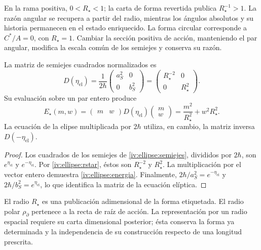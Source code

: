 En la rama positiva, \(0<R_\star<1\); la carta de forma
revertida publica \(R_\star^{-1}>1\). La razón angular
se recupera a partir del radio, mientras los ángulos absolutos
y su historia permanecen en el estado enriquecido.
La forma circular corresponde a \(C^*/A=0\), con
\(R_\star=1\). Cambiar la sección positiva de acción,
manteniendo el par angular, modifica la escala común de
los semiejes y conserva su razón.

\begin{proposition}
\label{iv:ellipse:matriz-prop}
La matriz de semiejes cuadrados normalizados es
\begin{equation}
 D(\eta_{\mathrm{el}})
 =\frac1{2\hbar}
    \begin{pmatrix}a_S^2&0\\0&b_S^2\end{pmatrix}
 =\begin{pmatrix}R_\star^{-2}&0\\0&R_\star^2\end{pmatrix}.
 \label{iv:ellipse:matriz}
\end{equation}
Su evaluación sobre un par entero produce
\begin{equation}
 E_\star(m,w)=
 \begin{pmatrix}m&w\end{pmatrix}
 D(\eta_{\mathrm{el}})
 \begin{pmatrix}m\\w\end{pmatrix}
 =\frac{m^2}{R_\star^2}+w^2R_\star^2.
 \label{iv:ellipse:energia}
\end{equation}
La ecuación de la elipse multiplicada por \(2\hbar\)
utiliza, en cambio, la matriz inversa \(D(-\eta_{\mathrm{el}})\).
\end{proposition}
\begin{proof}
Los cuadrados de los semiejes de
\eqref{iv:ellipse:semiejes}, divididos por \(2\hbar\),
son \(e^{\eta_{\mathrm{el}}}\) y
\(e^{-\eta_{\mathrm{el}}}\).
Por \eqref{iv:ellipse:rstar}, éstos son
\(R_\star^{-2}\) y \(R_\star^2\).
La multiplicación por el vector entero demuestra
\eqref{iv:ellipse:energia}. Finalmente,
\(2\hbar/a_S^2=e^{-\eta_{\mathrm{el}}}\) y
\(2\hbar/b_S^2=e^{\eta_{\mathrm{el}}}\), lo que
identifica la matriz de la ecuación elíptica.
\end{proof}

El radio \(R_\star\) es una publicación adimensional de
la forma etiquetada. El radio polar
\(\rho_{\partial}\) pertenece a la recta de raíz de acción.
La representación por un radio espacial requiere su carta
dimensional posterior; ésta conserva la forma ya determinada
y la independencia de su construcción respecto de una
longitud prescrita.
